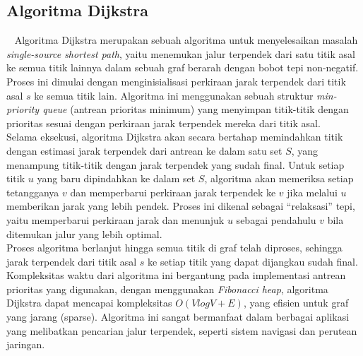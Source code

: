 \subsection{Algoritma Dijkstra}
\label{sec:dijkstra}
~\cite{Cormen:09:intro}
Algoritma Dijkstra merupakan sebuah algoritma untuk menyelesaikan masalah \textit{single-source shortest path}, yaitu menemukan jalur terpendek dari satu titik asal ke semua titik lainnya dalam sebuah graf berarah dengan bobot tepi non-negatif. Proses ini dimulai dengan menginisialisasi perkiraan jarak terpendek dari titik asal $s$ ke semua titik lain. Algoritma ini menggunakan sebuah struktur \textit{min-priority queue} (antrean prioritas minimum) yang menyimpan titik-titik dengan prioritas sesuai dengan perkiraan jarak terpendek mereka dari titik asal.
\\
Selama eksekusi, algoritma Dijkstra akan secara bertahap memindahkan titik dengan estimasi jarak terpendek dari antrean ke dalam satu set $S$, yang menampung titik-titik dengan jarak terpendek yang sudah final. Untuk setiap titik $u$ yang baru dipindahkan ke dalam set $S$, algoritma akan memeriksa setiap tetangganya $v$ dan memperbarui perkiraan jarak terpendek ke $v$ jika melalui $u$ memberikan jarak yang lebih pendek. Proses ini dikenal sebagai “relaksasi” tepi, yaitu memperbarui perkiraan jarak dan menunjuk $u$ sebagai pendahulu $v$ bila ditemukan jalur yang lebih optimal.
\\
Proses algoritma berlanjut hingga semua titik di graf telah diproses, sehingga jarak terpendek dari titik asal $s$ ke setiap titik yang dapat dijangkau sudah final. Kompleksitas waktu dari algoritma ini bergantung pada implementasi antrean prioritas yang digunakan, dengan menggunakan \textit{Fibonacci heap}, algoritma Dijkstra dapat mencapai kompleksitas $O(VlogV+E)$, yang efisien untuk graf yang jarang (sparse). Algoritma ini sangat bermanfaat dalam berbagai aplikasi yang melibatkan pencarian jalur terpendek, seperti sistem navigasi dan perutean jaringan.

